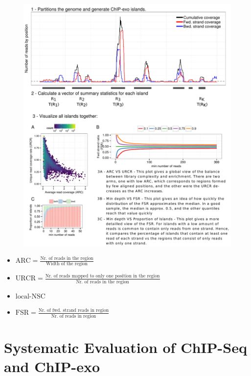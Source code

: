 \documentclass[compress,table,xcolor=dvipsnames]{beamer}\usepackage[]{graphicx}\usepackage[]{color}
\begin{document}
\begin{frame}[plain,t]

\begin{figure}[H]
  \centering
  \includegraphics[width = .75\textwidth]{../figs/for_paper/coverage_diagram2.pdf}
\end{figure}

{\small
  \begin{itemize}
  \item $\mbox{ARC} = \frac{\text{Nr. of reads in the
        region}}{\text{Width of the region}}$
  \item $\mbox{URCR} = \frac{\text{Nr. of reads mapped to only one
        position in the region}}{\text{Nr. of reads in the region}}$
  \item $\mbox{local-NSC}$
  \item $\mbox{FSR} = \frac{\text{Nr. of fwd. strand reads in region}}{\text{Nr. of reads in region}}$
  \end{itemize}  
}

\end{frame}



\section{Systematic Evaluation of ChIP-Seq and ChIP-exo}
\end{document}
